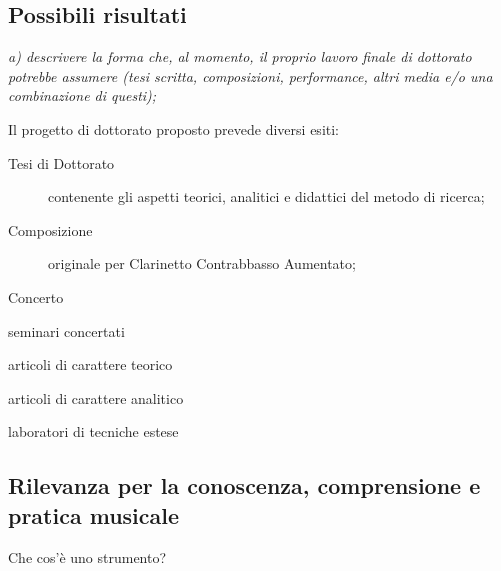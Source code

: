 \documentclass{gs-adonis}
\begin{document}
%
%
%

\subsection{Possibili risultati}%

\emph{a) descrivere la forma che, al momento, il proprio lavoro finale di dottorato potrebbe assumere (tesi scritta, composizioni, performance, altri media e/o una combinazione di questi);}

Il progetto di dottorato proposto prevede diversi esiti:

\begin{description}
  \item[Tesi di Dottorato] contenente gli aspetti teorici, analitici e didattici del metodo di ricerca;
  \item[Composizione] originale per Clarinetto Contrabbasso Aumentato;
  \item[Concerto]
\end{description}


seminari concertati

articoli di carattere teorico

articoli di carattere analitico

laboratori di tecniche estese

\subsection{Rilevanza per la conoscenza, comprensione e pratica musicale}


Che cos'è uno strumento?
\end{document}

